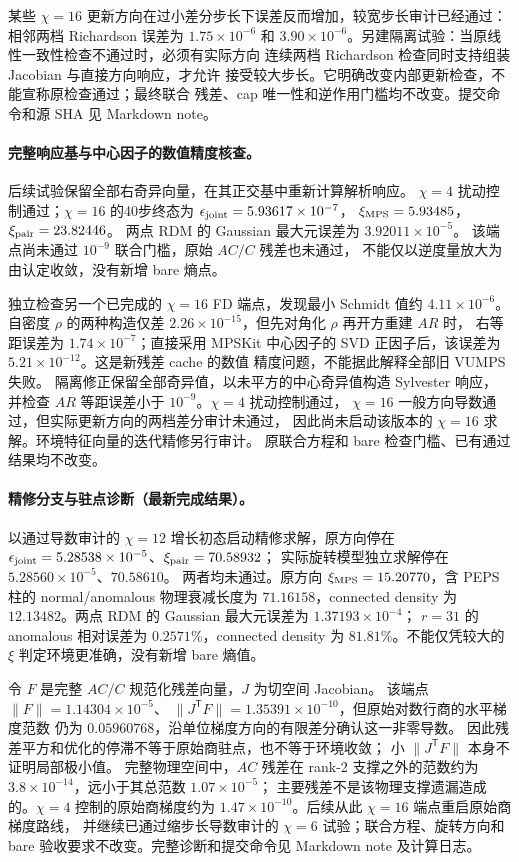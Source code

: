 某些 $\chi=16$ 更新方向在过小差分步长下误差反而增加，较宽步长审计已经通过：相邻两档 Richardson 误差为
$1.75\times10^{-6}$ 和 $3.90\times10^{-6}$。另建隔离试验：当原线性一致性检查不通过时，必须有实际方向
连续两档 Richardson 检查同时支持组装 Jacobian 与直接方向响应，才允许
接受较大步长。它明确改变内部更新检查，不能宣称原检查通过；最终联合
残差、cap 唯一性和逆作用门槛均不改变。提交命令和源 SHA 见 Markdown note。

\paragraph{完整响应基与中心因子的数值精度核查。}
后续试验保留全部右奇异向量，在其正交基中重新计算解析响应。
$\chi=4$ 扰动控制通过；$\chi=16$ 的40步终态为
$\epsilon_{\rm joint}=5.93617\times10^{-7}$，
$\xi_{\rm MPS}=5.93485$，$\xi_{\rm pair}=23.82446$。
两点 RDM 的 Gaussian 最大元误差为 $3.92011\times10^{-5}$。
该端点尚未通过 $10^{-9}$ 联合门槛，原始 $AC/C$ 残差也未通过，
不能仅以逆度量放大为由认定收敛，没有新增 bare 熵点。

独立检查另一个已完成的 $\chi=16$ FD 端点，发现最小 Schmidt 值约
$4.11\times10^{-6}$。自密度 $\rho$ 的两种构造仅差
$2.26\times10^{-15}$，但先对角化 $\rho$ 再开方重建 $AR$ 时，
右等距误差为 $1.74\times10^{-7}$；直接采用 MPSKit 中心因子的 SVD
正因子后，该误差为 $5.21\times10^{-12}$。这是新残差 cache 的数值
精度问题，不能据此解释全部旧 VUMPS 失败。
隔离修正保留全部奇异值，以未平方的中心奇异值构造 Sylvester 响应，
并检查 $AR$ 等距误差小于 $10^{-9}$。$\chi=4$ 扰动控制通过，
$\chi=16$ 一般方向导数通过，但实际更新方向的两档差分审计未通过，
因此尚未启动该版本的 $\chi=16$ 求解。环境特征向量的迭代精修另行审计。
原联合方程和 bare 检查门槛、已有通过结果均不改变。

\paragraph{精修分支与驻点诊断（最新完成结果）。}
以通过导数审计的 $\chi=12$ 增长初态启动精修求解，原方向停在
$\epsilon_{\rm joint}=5.28538\times10^{-5}$、$\xi_{\rm pair}=70.58932$；
实际旋转模型独立求解停在 $5.28560\times10^{-5}$、$70.58610$。
两者均未通过。原方向 $\xi_{\rm MPS}=15.20770$，含 PEPS 柱的
normal/anomalous 物理衰减长度为 $71.16158$，connected density 为
$12.13482$。两点 RDM 的 Gaussian 最大元误差为 $1.37193\times10^{-4}$；
$r=31$ 的 anomalous 相对误差为 $0.2571\%$，connected density 为
$81.81\%$。不能仅凭较大的 $\xi$ 判定环境更准确，没有新增 bare 熵值。

令 $F$ 是完整 $AC/C$ 规范化残差向量，$J$ 为切空间 Jacobian。
该端点 $\|F\|=1.14304\times10^{-5}$、
$\|J^{\mathsf T}F\|=1.35391\times10^{-10}$，但原始对数行商的水平梯度范数
仍为 $0.05960768$，沿单位梯度方向的有限差分确认这一非零导数。
因此残差平方和优化的停滞不等于原始商驻点，也不等于环境收敛；
小 $\|J^{\mathsf T}F\|$ 本身不证明局部极小值。
完整物理空间中，$AC$ 残差在 rank-2 支撑之外的范数约为
$3.8\times10^{-14}$，远小于其总范数 $1.07\times10^{-5}$；
主要残差不是该物理支撑遗漏造成的。$\chi=4$ 控制的原始商梯度约为
$1.47\times10^{-10}$。后续从此 $\chi=16$ 端点重启原始商梯度路线，
并继续已通过缩步长导数审计的 $\chi=6$ 试验；联合方程、旋转方向和
bare 验收要求不改变。完整诊断和提交命令见 Markdown note 及计算日志。

